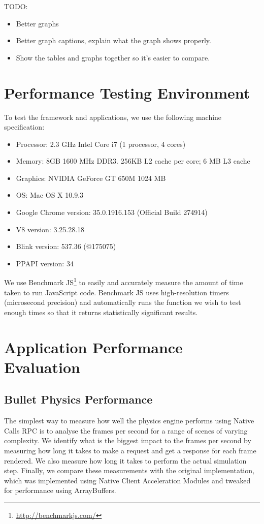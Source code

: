 TODO:
\begin{itemize}
  \item Better graphs
  \item Better graph captions, explain what the graph shows properly.
  \item Show the tables and graphs together so it's easier to compare.
\end{itemize}
\section{Performance Testing Environment} %
\label{sec:performance_testing_environment}
To test the framework and applications, we use the following machine specification:
\begin{itemize}
  \item Processor: 2.3 GHz Intel Core i7 (1 processor, 4 cores)
  \item Memory: 8GB 1600 MHz DDR3. 256KB L2 cache per core; 6 MB L3 cache
  \item Graphics: NVIDIA GeForce GT 650M 1024 MB
  \item OS: Mac OS X 10.9.3
  \item Google Chrome version: 35.0.1916.153 (Official Build 274914) 
  \item V8 version: 3.25.28.18
  \item Blink version: 537.36 (@175075)
  \item PPAPI version: 34
\end{itemize}

We use Benchmark JS\footnote{\url{http://benchmarkjs.com/}} to easily and accurately measure the amount of time taken to run JavaScript code. Benchmark JS uses high-resolution timers (microsecond precision) and automatically runs the function we wish to test enough times so that it returns statistically significant results. 

\section{Application Performance Evaluation} %
\label{sec:application_performance_evaluation}
\subsection{Bullet Physics Performance} %
\label{sub:bullet_physics_performance}
The simplest way to measure how well the physics engine performs using Native Calls RPC is to analyse the frames per second for a range of scenes of varying complexity. We identify what is the biggest impact to the frames per second by measuring how long it takes to make a request and get a response for each frame rendered. We also measure how long it takes to perform the actual simulation step. Finally, we compare these measurements with the original implementation, which was implemented using Native Client Acceleration Modules and tweaked for performance using ArrayBuffers.

